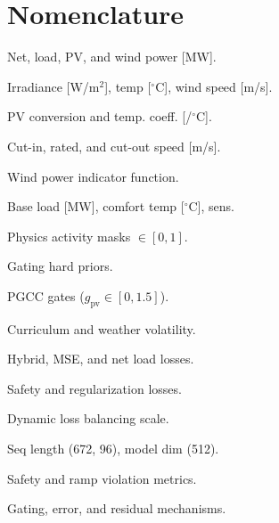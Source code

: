 \section*{Nomenclature}
\begin{IEEEdescription}
\item[$P_{\text{net}}, P_{\text{load}}, P_{\text{pv}}, P_{\text{wind}}$] Net, load, PV, and wind power [MW].
\item[$G, T, v$] Irradiance [W/m$^2$], temp [$^\circ$C], wind speed [m/s].
\item[$\eta_{\text{pv}}, \beta_T$] PV conversion and temp. coeff. [/$^\circ$C].
\item[$v_{\text{ci}}, v_r, v_{\text{co}}$] Cut-in, rated, and cut-out speed [m/s].
\item[$\Gamma_{\text{run}}$] Wind power indicator function.
\item[$P_{\text{base}}, T_c, \gamma$] Base load [MW], comfort temp [$^\circ$C], sens.
\item[$a_{\text{pv}}, a_{\text{wind}}$] Physics activity masks $\in [0,1]$.
\item[$p_{\text{pv}}, p_{\text{wind}}$] Gating hard priors.
\item[$g_{\text{pv}}, g_{\text{wind}}$] PGCC gates ($g_{\text{pv}} \in [0, 1.5]$).
\item[$\alpha, \upsilon$] Curriculum and weather volatility.
\item[$\mathcal{L}_{\text{total}}, \mathcal{L}_{\text{mse}}, \mathcal{L}_{\text{net}}$] Hybrid, MSE, and net load losses.
\item[$\mathcal{L}_{\text{bvr}}, \mathcal{L}_{\text{rvr}}, \mathcal{L}_{\text{prior}}$] Safety and regularization losses.
\item[$\gamma_{\text{ema}}$] Dynamic loss balancing scale.
\item[$S, P, D$] Seq length (672, 96), model dim (512).
\item[$\text{BVR, MVS, RVM}$] Safety and ramp violation metrics.
\item[$\text{PGCC, NRMSE, BPAR}$] Gating, error, and residual mechanisms.
\end{IEEEdescription}
